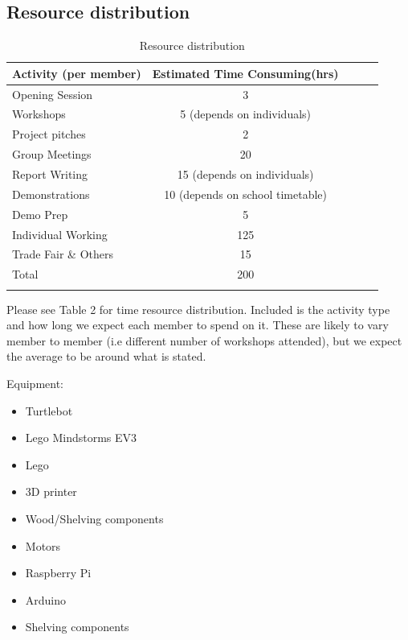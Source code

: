 \documentclass{article}
\begin{document}
\subsection{Resource distribution}
\begin{table}[h]
\vskip 3mm
\begin{center}
\begin{small}
\begin{sc}
\begin{tabular}{lcccr}
\hline
\abovespace\belowspace
Activity (per member) & Estimated Time Consuming(hrs) \\ \hline
\hline
\abovespace
Opening Session & 3 \\ \hline
Workshops & 5 (depends on individuals) \\ \hline
Project pitches & 2 \\ \hline
Group Meetings & 20  \\ \hline
Report Writing & 15 (depends on individuals) \\ \hline
Demonstrations & 10 (depends on school timetable) \\ \hline
Demo Prep & 5 \\ \hline
Individual Working  & 125 \\ \hline
Trade Fair \& Others & 15 \\ \hline
Total & 200 \\ \hline
\belowspace
\end{tabular}
\end{sc}
\end{small}
\caption{Resource distribution}
\label{tab:sample-table}
\end{center}
\vskip -3mm
\end{table}

Please see Table 2 for time resource distribution. Included is the activity type and how long we expect each member to spend on it. 
These are likely to vary member to member (i.e different number of workshops attended), but we expect the average to be around what is stated.

Equipment: 
\begin{itemize}
\item Turtlebot
\item Lego Mindstorms EV3
\item Lego
\item 3D printer
\item Wood/Shelving components 
\item Motors
\item Raspberry Pi
\item Arduino
\item Shelving components
\end{itemize}
\end{document}
